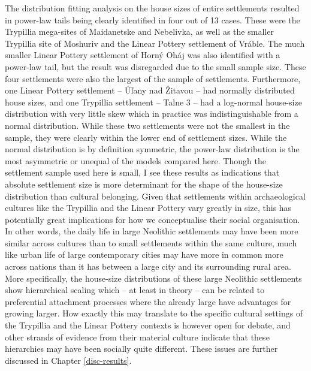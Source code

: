 \documentclass[
  12pt,
]{book}
\begin{document}
The distribution fitting analysis on the house sizes of entire settlements resulted in power-law tails being clearly identified in four out of 13 cases. These were the Trypillia mega-sites of Maidanetske and Nebelivka, as well as the smaller Trypillia site of Moshuriv and the Linear Pottery settlement of Vráble. The much smaller Linear Pottery settlement of Horný Oháj was also identified with a power-law tail, but the result was disregarded due to the small sample size. These four settlements were also the largest of the sample of settlements. Furthermore, one Linear Pottery settlement -- Úľany nad Žitavou -- had normally distributed house sizes, and one Trypillia settlement -- Talne 3 -- had a log-normal house-size distribution with very little skew which in practice was indistinguishable from a normal distribution. While these two settlements were not the smallest in the sample, they were clearly within the lower end of settlement sizes. While the normal distribution is by definition symmetric, the power-law distribution is the most asymmetric or unequal of the models compared here. Though the settlement sample used here is small, I see these results as indications that absolute settlement size is more determinant for the shape of the house-size distribution than cultural belonging. Given that settlements within archaeological cultures like the Trypillia and the Linear Pottery vary greatly in size, this has potentially great implications for how we conceptualise their social organisation. In other words, the daily life in large Neolithic settlements may have been more similar across cultures than to small settlements within the same culture, much like urban life of large contemporary cities may have more in common more across nations than it has between a large city and its surrounding rural area. More specifically, the house-size distributions of these large Neolithic settlements show hierarchical scaling which -- at least in theory -- can be related to preferential attachment processes where the already large have advantages for growing larger. How exactly this may translate to the specific cultural settings of the Trypillia and the Linear Pottery contexts is however open for debate, and other strands of evidence from their material culture indicate that these hierarchies may have been socially quite different. These issues are further discussed in Chapter \ref{disc-results}.
\end{document}
